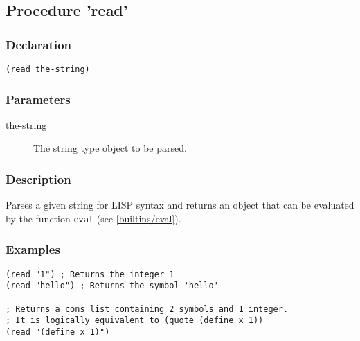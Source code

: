\subsection{Procedure 'read'}
\label{builtins/read}

\subsubsection*{Declaration}
\begin{lstlisting}
(read the-string)
\end{lstlisting}

\subsubsection*{Parameters}
\begin{description}
	\item[the-string] The string type object to be parsed.
\end{description}

\subsubsection*{Description}
Parses a given string for LISP syntax and returns an object that can be evaluated by the function \lstinline|eval| (see \ref{builtins/eval}).

\subsubsection*{Examples}
\begin{lstlisting}
(read "1") ; Returns the integer 1
(read "hello") ; Returns the symbol 'hello'

; Returns a cons list containing 2 symbols and 1 integer.
; It is logically equivalent to (quote (define x 1))
(read "(define x 1)")
\end{lstlisting}
